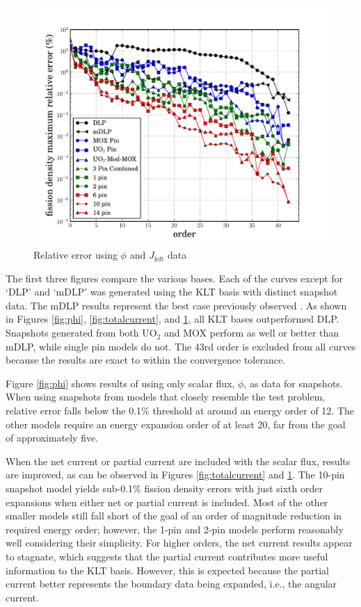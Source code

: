 \documentclass{anstrans}
\begin{document}
\begin{figure}[htb]
 \centering
 \includegraphics[trim=.5cm .25cm 1.5cm 1.25cm, clip=true, totalheight=0.28\textheight]{partialcurrent}
 \caption{Relative error using $\phi$ and $J_{\text{left}}$ data}
 \label{fig:partialcurrent}
\end{figure}

The first three figures compare the various bases.  Each of the curves except for `DLP' and `mDLP' was generated using the KLT basis with distinct snapshot data. The mDLP results represent the best case previously observed \cite{Roberts2014}.  As shown in Figures \ref{fig:phi}, \ref{fig:totalcurrent}, and \ref{fig:partialcurrent}, all KLT bases outperformed DLP.  Snapshots generated from both UO$_2$ and MOX perform as well or better than mDLP, while single pin models do not. The 43rd order is excluded from all curves because the results are exact to within the convergence tolerance.

Figure \ref{fig:phi} shows results of using only scalar flux, $\phi$, as data for snapshots.  When using snapshots from models that closely resemble the test problem, relative error falls below the 0.1$\%$ threshold at around an energy order of 12.  The other models require an energy expansion order of at least 20, far from the goal of approximately five.

When the net current or partial current are included with the scalar flux, results are improved, as can be observed in Figures \ref{fig:totalcurrent} and \ref{fig:partialcurrent}.  The 10-pin snapshot model yields sub-0.1$\%$ fission density errors with just sixth order expansions when either net or partial current is included.  Most of the other smaller models still fall short of the goal of an order of magnitude reduction in required energy order; however, the 1-pin and 2-pin models perform reasonably well considering their simplicity.  For higher orders, the net current results appear to stagnate, which suggests that the partial current contributes more useful information to the KLT basis.  However, this is expected because the partial current better represents the boundary data being expanded, i.e., the angular current.
\end{document}
